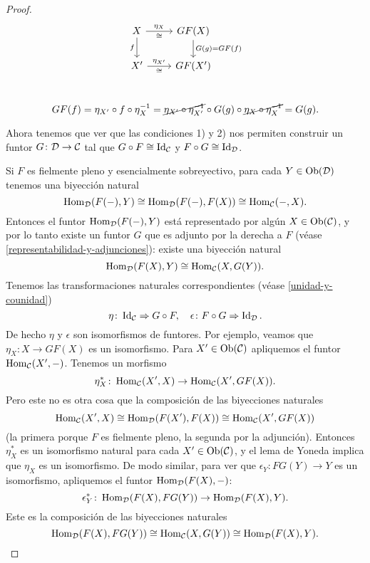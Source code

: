 \documentclass{article}
\numberwithin{equation}{section}
\theoremstyle{definition}
\begin{document}
\begin{proposicion}
\begin{proof}
   \[ \begin{tikzcd}
       X\ar{r}{\eta_X}[swap]{\isom}\ar{d}[swap]{f} & G F (X)\ar{d}{G (g) = GF (f)} \\
       X'\ar{r}{\eta_{X'}}[swap]{\isom} & G F (X') \\
     \end{tikzcd} \]

   \[ GF (f) =
      \eta_{X'}\circ f\circ \eta_X^{-1} =
      \cancel{\eta_{X'}\circ \eta_{X'}^{-1}} \circ G (g) \circ \cancel{\eta_X\circ \eta_X^{-1}} =
      G (g). \]

    \vspace{1em}

    Ahora tenemos que ver que las condiciones 1) y 2) nos permiten construir un
    funtor $G\colon \mathcal{D} \to \mathcal{C}$ tal que
    $G\circ F\cong \operatorname{Id}_\mathcal{C}$ y $F\circ G \cong \operatorname{Id}_\mathcal{D}$.

    Si $F$ es fielmente pleno y esencialmente sobreyectivo, para cada
    $Y\in \operatorname{Ob} (\mathcal{D})$ tenemos una biyección natural
    \[ \operatorname{Hom}_\mathcal{D} (F (-), Y) \cong
       \operatorname{Hom}_\mathcal{D} (F (-), F (X)) \cong
       \operatorname{Hom}_\mathcal{C} (-, X). \]
    Entonces el funtor $\operatorname{Hom}_\mathcal{D} (F (-), Y)$ está representado por algún
    $X \in \operatorname{Ob} (\mathcal{C})$, y por lo tanto existe un funtor $G$ que es adjunto
    por la derecha a $F$ (véase \ref{representabilidad-y-adjunciones}): existe
    una biyección natural
    $$\operatorname{Hom}_\mathcal{D} (F (X), Y) \cong \operatorname{Hom}_\mathcal{C} (X, G(Y)).$$
    Tenemos las transformaciones naturales correspondientes (véase
    \ref{unidad-y-counidad})
    \[ \eta\colon \operatorname{Id}_\mathcal{C} \Rightarrow G\circ F, \quad
       \epsilon\colon F\circ G \Rightarrow \operatorname{Id}_\mathcal{D}. \]
    De hecho $\eta$ y $\epsilon$ son isomorfismos de funtores. Por ejemplo,
    veamos que $\eta_X\colon X \to GF (X)$ es un isomorfismo. Para
    $X'\in \operatorname{Ob} (\mathcal{C})$ apliquemos el funtor $\operatorname{Hom}_\mathcal{C}
    (X',-)$. Tenemos un morfismo
    $$\eta_X^*\colon \operatorname{Hom}_\mathcal{C} (X',X) \to \operatorname{Hom}_\mathcal{C} (X', GF (X)).$$
    Pero este no es otra cosa que la composición de las biyecciones naturales
    \[ \operatorname{Hom}_\mathcal{C} (X',X) \cong
       \operatorname{Hom}_\mathcal{D} (F (X'), F (X)) \cong
       \operatorname{Hom}_\mathcal{C} (X', GF (X)) \]
    (la primera porque $F$ es fielmente pleno, la segunda por la
    adjunción). Entonces $\eta_X^*$ es un isomorfismo natural para cada
    $X' \in \operatorname{Ob} (\mathcal{C})$, y el lema de Yoneda implica que $\eta_X$ es un
    isomorfismo. De modo similar, para ver que $\epsilon_Y\colon FG (Y) \to Y$
    es un isomorfismo, apliquemos el funtor $\operatorname{Hom}_\mathcal{D} (F (X), -)$:
    $$\epsilon_Y^*\colon \operatorname{Hom}_\mathcal{D} (F (X), FG (Y)) \to \operatorname{Hom}_\mathcal{D} (F (X),Y).$$
    Este es la composición de las biyecciones naturales
    \[ \operatorname{Hom}_\mathcal{D} (F (X), FG (Y)) \cong
       \operatorname{Hom}_\mathcal{C} (X, G (Y)) \cong
       \operatorname{Hom}_\mathcal{D} (F (X), Y). \qedhere \]
  \end{proof}
\end{proposicion}
\end{document}
